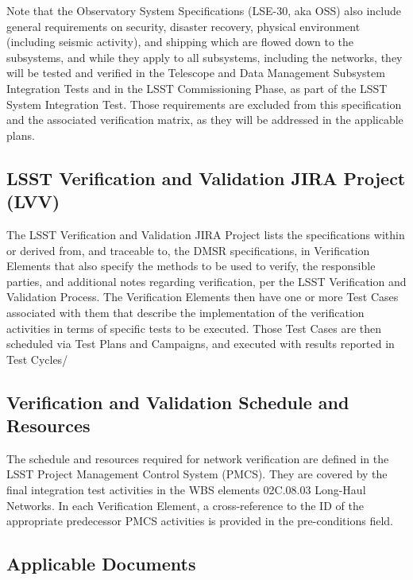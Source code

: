 \documentclass[DM,lsstdraft,STS,toc]{lsstdoc}
\begin{document}
Note that the Observatory System Specifications (LSE-30, aka OSS) also include general requirements 
on security, disaster recovery, physical environment (including seismic activity), and shipping 
which are flowed down to the subsystems, and while they apply to all subsystems, including the networks, 
they will be tested and verified in the Telescope and Data Management Subsystem Integration Tests and in 
the LSST Commissioning Phase, as part of the LSST System Integration Test.  Those requirements are excluded 
from this specification and the associated verification matrix, as they will be addressed in the applicable plans.

\subsection{LSST Verification and Validation JIRA Project (LVV)}\label{sec:lvv}

The LSST Verification and Validation JIRA Project lists the specifications within or derived from, 
and traceable to, the DMSR specifications, in Verification Elements that also specify the methods 
to be used to verify, the responsible parties, and additional notes regarding verification, per the 
 LSST Verification and Validation Process. The Verification Elements then have one or more 
Test Cases associated with them that describe the implementation of the verification activities in terms 
of specific tests to be executed.  Those Test Cases are then scheduled via Test Plans and Campaigns, 
and executed with results reported in Test Cycles/

\subsection{Verification and Validation Schedule and Resources}\label{sec:schedule}

The schedule and resources required for network verification are defined in the LSST 
Project Management Control System (PMCS).  They are covered by the final integration test activities in 
the WBS elements 02C.08.03 Long-Haul Networks.  In each Verification Element, a cross-reference to the 
ID of the appropriate predecessor PMCS activities is provided in the pre-conditions field.


\subsection{Applicable Documents}
\label{sec:docs}
\end{document}
